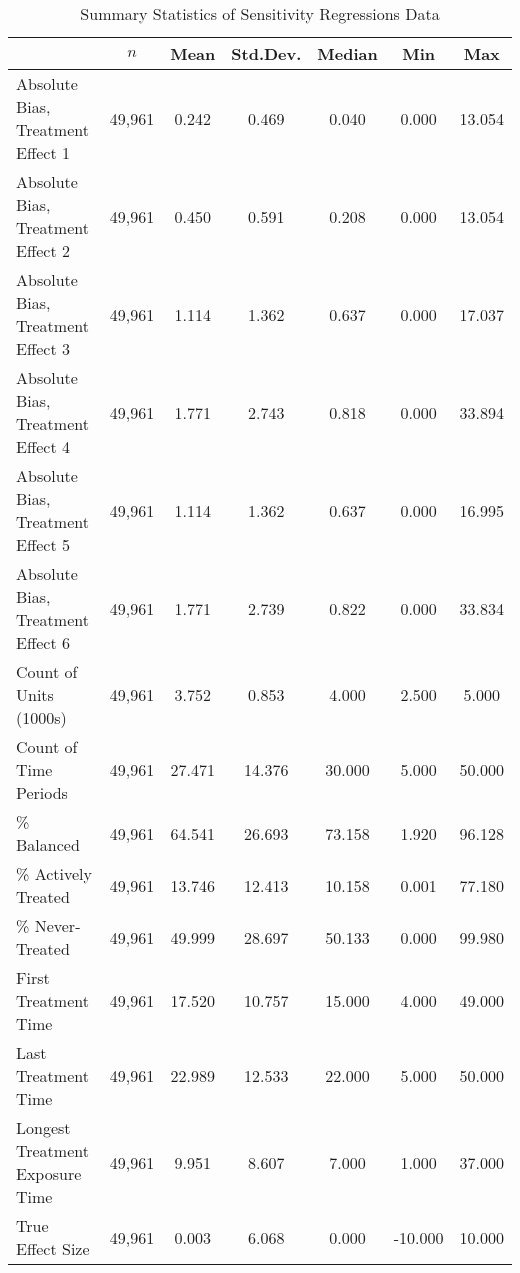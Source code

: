 \begin{table}[htbp]\centering
\def\sym#1{\ifmmode^{#1}\else\(^{#1}\)\fi}
\caption{Summary Statistics of Sensitivity Regressions Data}
\label{tab:sensitivity-summary-stats}
\def\sym#1{\ifmmode^{#1}\else\(^{#1}\)\fi}
\begin{tabular}{l*{1}{cccccc}}
\hline\hline
                    &         $n$&        Mean&    Std.Dev.&      Median&         Min&         Max\\
\hline
Absolute Bias, Treatment Effect 1&      49,961&       0.242&       0.469&       0.040&       0.000&      13.054\\
Absolute Bias, Treatment Effect 2&      49,961&       0.450&       0.591&       0.208&       0.000&      13.054\\
Absolute Bias, Treatment Effect 3&      49,961&       1.114&       1.362&       0.637&       0.000&      17.037\\
Absolute Bias, Treatment Effect 4&      49,961&       1.771&       2.743&       0.818&       0.000&      33.894\\
Absolute Bias, Treatment Effect 5&      49,961&       1.114&       1.362&       0.637&       0.000&      16.995\\
Absolute Bias, Treatment Effect 6&      49,961&       1.771&       2.739&       0.822&       0.000&      33.834\\
Count of Units (1000s)&      49,961&       3.752&       0.853&       4.000&       2.500&       5.000\\
Count of Time Periods&      49,961&      27.471&      14.376&      30.000&       5.000&      50.000\\
\% Balanced         &      49,961&      64.541&      26.693&      73.158&       1.920&      96.128\\
\% Actively Treated &      49,961&      13.746&      12.413&      10.158&       0.001&      77.180\\
\% Never-Treated    &      49,961&      49.999&      28.697&      50.133&       0.000&      99.980\\
First Treatment Time&      49,961&      17.520&      10.757&      15.000&       4.000&      49.000\\
Last Treatment Time &      49,961&      22.989&      12.533&      22.000&       5.000&      50.000\\
Longest Treatment Exposure Time&      49,961&       9.951&       8.607&       7.000&       1.000&      37.000\\
True Effect Size    &      49,961&       0.003&       6.068&       0.000&     -10.000&      10.000\\

\end{tabular}
\end{table}
